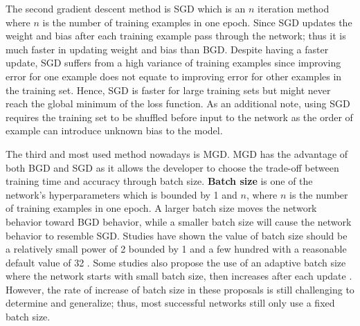 The second gradient descent method is SGD which is an $n$ iteration method where $n$ is the number of training examples in one epoch. Since SGD updates the weight and bias after each training example pass through the network; thus it is much faster in updating weight and bias than BGD. Despite having a faster update, SGD suffers from a high variance of training examples since improving error for one example does not equate to improving error for other examples in the training set. Hence, SGD is faster for large training sets but might never reach the global minimum of the loss function. As an additional note, using SGD requires the training set to be shuffled before input to the network as the order of example can introduce unknown bias to the model.

The third and most used method nowadays is MGD. MGD has the advantage of both BGD and SGD as it allows the developer to choose the trade-off between training time and accuracy through batch size. \textbf{Batch size} is one of the network's hyperparameters which is bounded by 1 and $n$, where $n$ is the number of training examples in one epoch. A larger batch size moves the network behavior toward BGD behavior, while a smaller batch size will cause the network behavior to resemble SGD. Studies have shown the value of batch size should be a relatively small power of 2 bounded by 1 and a few hundred with a reasonable default value of 32 \cite{bengio2012practical, masters2018revisiting}. Some studies also propose the use of an adaptive batch size where the network starts with small batch size, then increases after each update \cite{lecun2012efficient}. However, the rate of increase of batch size in these proposals is still challenging to determine and generalize; thus, most successful networks still only use a fixed batch size.

